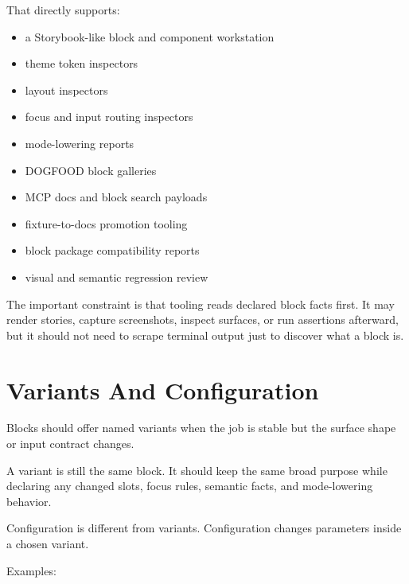 That directly supports:

\begin{itemize}
\tightlist
\item
  a Storybook-like block and component workstation
\item
  theme token inspectors
\item
  layout inspectors
\item
  focus and input routing inspectors
\item
  mode-lowering reports
\item
  DOGFOOD block galleries
\item
  MCP docs and block search payloads
\item
  fixture-to-docs promotion tooling
\item
  block package compatibility reports
\item
  visual and semantic regression review
\end{itemize}

The important constraint is that tooling reads declared block facts first. It may render stories, capture screenshots, inspect surfaces, or run assertions afterward, but it should not need to scrape terminal output just to discover what a block is.

\section{Variants And Configuration}\label{record-128-variants-and-configuration}

Blocks should offer named variants when the job is stable but the surface shape or input contract changes.

A variant is still the same block. It should keep the same broad purpose while declaring any changed slots, focus rules, semantic facts, and mode-lowering behavior.

Configuration is different from variants. Configuration changes parameters inside a chosen variant.

Examples:

